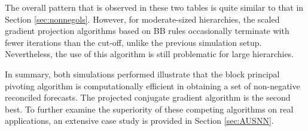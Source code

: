 \documentclass[11pt]{article}
\newcommand{\0}{\phantom{0}}
\begin{document}
The overall pattern that is observed in these two tables is quite similar to that in Section \ref{sec:nonnegols}. However, for moderate-sized hierarchies, the scaled gradient projection algorithms based on BB rules occasionally terminate with fewer iterations than the cut-off, unlike the previous simulation setup. Nevertheless, the use of this algorithm is still problematic for  large hierarchies.

In summary, both simulations performed illustrate that the block principal pivoting algorithm is computationally efficient in obtaining a set of non-negative reconciled forecasts. The projected conjugate gradient algorithm is the second best. To further examine the superiority of these competing algorithms on real applications, an extensive case study is provided in Section \ref{sec:AUSNN}.
\end{document}

